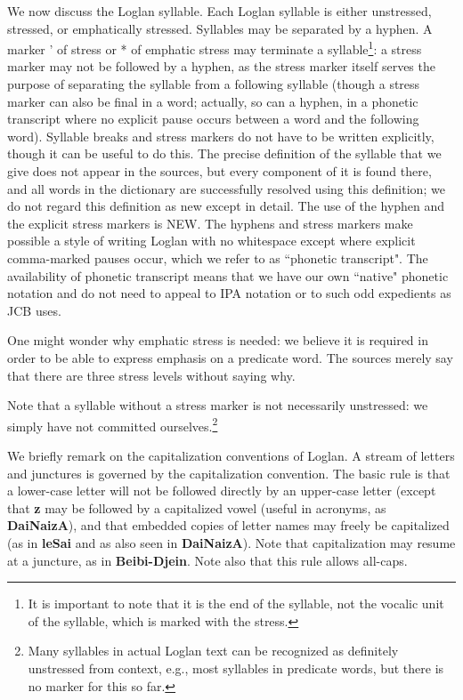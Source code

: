 \documentclass[12pt]{book}
\begin{document}
We now discuss the Loglan syllable.  Each Loglan syllable is either unstressed, stressed, or emphatically stressed.  Syllables may be separated by a hyphen.
A marker ' of stress or * of emphatic stress may terminate a syllable\footnote{It is important to note that it is the end of the syllable, not the vocalic unit of the syllable, which is marked with the stress.}:  a stress marker may not be followed by a hyphen, as the stress marker itself serves the purpose of separating the syllable from a following syllable (though a stress marker can also be final in a word; actually, so can a hyphen, in a phonetic transcript where no explicit pause occurs between a word and the following word).  Syllable breaks and stress markers do not have to be written explicitly, though it can be useful to do this.  The precise definition of the syllable that we give does not appear in the sources, but every component of it is found there, and all words in the dictionary are successfully resolved using this definition;  we do not regard this definition as new except in detail.  The use of the hyphen and the explicit stress markers is NEW.  The hyphens and stress markers make possible a style of writing Loglan with no whitespace except where explicit comma-marked pauses occur, which we refer to as ``phonetic transcript".  The availability of phonetic transcript means that we have our own ``native" phonetic notation and do not need to appeal to IPA notation or to such odd expedients as JCB uses.

One might wonder why emphatic stress is needed:  we believe it is required in order to be able to express emphasis on a predicate word.  The sources merely say that there are three stress levels without saying why.

Note that a syllable without a stress marker is not necessarily unstressed:  we simply have not committed ourselves.\footnote{Many syllables in actual Loglan text can be recognized as definitely unstressed from context, e.g., most syllables in predicate words, but there is no marker for this so far.}

We briefly remark on the capitalization conventions of Loglan.  A stream of letters and junctures is governed by the capitalization convention.  The basic rule is that a lower-case letter will not be followed directly by an upper-case letter (except that {\bf z} may be followed by a capitalized vowel (useful in acronyms, as {\bf DaiNaizA}), and that embedded copies of letter names may freely be capitalized (as in {\bf leSai} and as also seen in {\bf DaiNaizA}).  Note that capitalization may resume at a juncture, as in {\bf Beibi-Djein}.  Note also that this rule allows all-caps.
\end{document}
